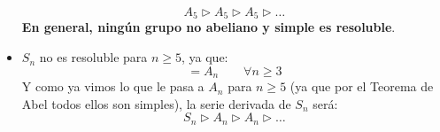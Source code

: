 \begin{ejemplo}
\begin{itemize}
            \begin{equation*}
                A_5 \rhd A_5 \rhd A_5 \rhd \ldots
            \end{equation*}
            \textbf{En general, ningún grupo no abeliano y simple es resoluble}.
        \item $S_n$ no es resoluble para $n\geq 5$, ya que:
            \begin{equation*}
                [S_n, S_n] = A_n  \qquad \forall n\geq 3
            \end{equation*}
            Y como ya vimos lo que le pasa a $A_n$ para $n\geq 5$ (ya que por el Teorema de Abel todos ellos son simples), la serie derivada de $S_n$ será:
            \begin{equation*}
                S_n \rhd A_n \rhd A_n \rhd \ldots
            \end{equation*}
    \end{itemize}
\end{ejemplo}

